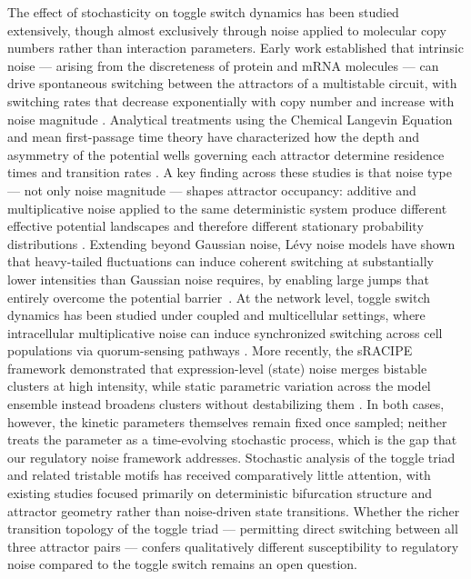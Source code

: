 \documentclass[11pt]{article}
\begin{document}
The effect of stochasticity on toggle switch dynamics has been studied extensively, though almost exclusively through noise applied to molecular copy numbers rather than interaction parameters. Early work established that intrinsic noise — arising from the discreteness of protein and mRNA molecules — can drive spontaneous switching between the attractors of a multistable circuit, with switching rates that decrease exponentially with copy number and increase with noise magnitude \cite{tian2006stochastic, Wang2007Noise-inducedSwitch}. Analytical treatments using the Chemical Langevin Equation and mean first-passage time theory have characterized how the depth and asymmetry of the potential wells governing each attractor determine residence times and transition rates \cite{Wang2010TheDifferentiation, Strasser2012StabilityExpression, Xu2014SwitchSwitch}. A key finding across these studies is that noise type — not only noise magnitude — shapes attractor occupancy: additive and multiplicative noise applied to the same deterministic system produce different effective potential landscapes and therefore different stationary probability distributions \cite{Jaruszewicz2013ToggleGene}. Extending beyond Gaussian noise, Lévy noise models have shown that heavy-tailed fluctuations can induce coherent switching at substantially lower intensities than Gaussian noise requires, by enabling large jumps that entirely overcome the potential barrier~\cite{Xu2016TheNoise}. At the network level, toggle switch dynamics has been studied under coupled and multicellular settings, where intracellular multiplicative noise can induce synchronized switching across cell populations via quorum-sensing pathways \cite{Wang2007Noise-inducedSwitch}. More recently, the sRACIPE framework demonstrated that expression-level (state) noise merges bistable clusters at high intensity, while static parametric variation across the model ensemble instead broadens clusters without destabilizing them \cite{Kohar2018RoleCircuits}. In both cases, however, the kinetic parameters themselves remain fixed once sampled; neither treats the parameter as a time-evolving stochastic process, which is the gap that our regulatory noise framework addresses. Stochastic analysis of the toggle triad and related tristable motifs has received comparatively little attention, with existing studies focused primarily on deterministic bifurcation structure and attractor geometry \cite{doi:10.1098/rsif.2020.0631, Duddu2025DistinctNetworks} rather than noise-driven state transitions. Whether the richer transition topology of the toggle triad — permitting direct switching between all three attractor pairs — confers qualitatively different susceptibility to regulatory noise compared to the toggle switch remains an open question.
\end{document}
